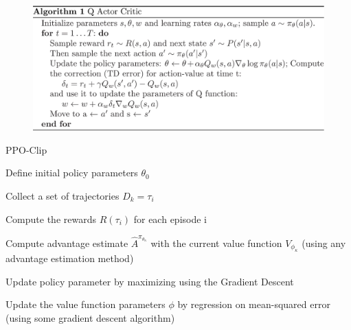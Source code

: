 \documentclass[conference]{IEEEtran}
\begin{document}
\begin{figure}[!htb]
\centering
\includegraphics[width=\columnwidth, height=\columnwidth,keepaspectratio]{RL_project_update/a2c_only.png}
\label{fig:your_label}
\end{figure}


\begin{algorithm}
\caption{PPO-Clip}\label{ppo_psuedocode}

\begin{algorithmic}[1]

\State Define initial policy parameters $\theta_0$


\State Collect a set of trajectories $D_{k} = {\tau_{i}}$

\State Compute the rewards $R(\tau_{i})$ for each episode i

\State Compute advantage estimate $\hat{A}^{\pi_{\theta_{\kappa}}}$ with the current value function $V_{\phi_{\kappa}}$ (using any advantage estimation method)

\State Update policy parameter by maximizing using the Gradient Descent

\State Update the value function parameters $\phi$ by regression on mean-squared error (using some gradient descent algorithm)

\EndFor

\end{algorithmic}

\end{algorithm}
\end{document}
